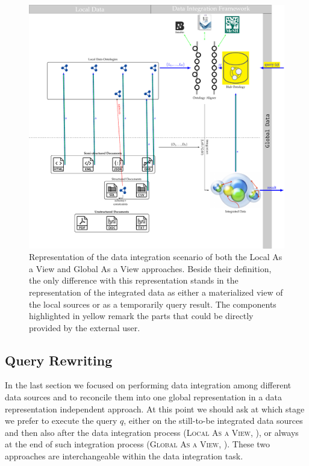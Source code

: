 

\begin{figure}[!t]
	\centering
	\includegraphics[width=\textwidth]{fig/01dataint/LAV}
	\caption{Representation of the data integration scenario of both the Local As a View and Global As a View approaches. Beside their definition, the only difference with this representation stands in the representation of the integrated data as either a materialized view of the local sources or as a temporarily query result. The components highlighted in yellow remark the parts that could be directly provided by the external user.}
	\label{fig:lavgav}
\end{figure}
\subsection{Query Rewriting}\label{subsec:queryrw}
In the last section we focused on performing data integration among different data sources and to reconcile them into one global representation in a data representation independent approach. At this point we should ask at  which stage we prefer to execute the query $q$, either on the still-to-be integrated data sources and then also after the data integration process (\textsc{Local As a View}, \cite{ManolescuFK01,Nadal0AVV17,SintSSF09}), or always at the end of such integration process (\textsc{Global As a View}, \cite{magnani04,Magnani06,Lu2006,BotoevaCCRX16}). These two approaches are interchangeable within the data integration task.

